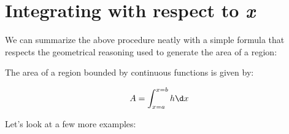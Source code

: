 \documentclass{ximera}
\begin{document}
\begin{comment}
          \draw[decoration={brace,raise=.2cm},decorate,thin] (axis cs:1.51,2.375)--(axis cs:1.51,6.84);
          \node[anchor=east] at (axis cs:1.45,4.6) {$f(x)-g(x)$};
        \end{axis}
\end{tikzpicture}
\end{image}
In this case, the integral
\begin{image}
  \begin{tikzpicture}[scale=2,every node/.style={transform shape}]
    \node at (0,0) {
      $\color{green!70!black!70!blue}\int_{a}^{b}\color{purple!50!blue!90!black}{f(x) - g(x)} \,\color{blue!70!green}{\d x}$
    };
  \end{tikzpicture}
\end{image}
could be interpreted as:
\begin{quote}
  \large\textbf{The \textcolor{green!70!black!70!blue}{sum} of the
    area of rectangles whose
    \textcolor{purple!50!blue!90!black}{heights are the difference
      between the top curve and bottom curve}, and whose
    \textcolor{blue!70!green}{widths are infinitesimal}.}
\end{quote}
This way of thinking about integrals will be very useful to us in
later, more complex, applications.

\end{comment}


\section{Integrating with respect to \textit{x}}

We can summarize the above procedure neatly with a simple formula that respects the geometrical reasoning used to generate the area of a region:

\begin{theorem}
The area of a region bounded by continuous functions is given by: 

\[A=\int_{x=a}^{x=b} h \d x \]

\end{theorem}

Let's look at a few more examples:


\end{document}
